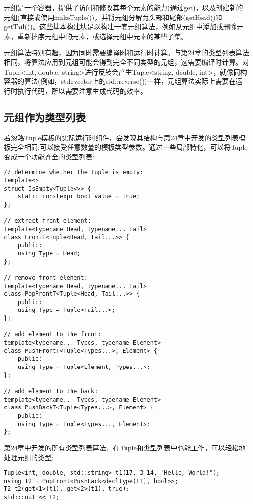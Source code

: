 
元组是一个容器，提供了访问和修改其每个元素的能力(通过get)，以及创建新的元组(直接或使用makeTuple())，并将元组分解为头部和尾部(getHead()和getTail())。这些基本构建块足以构建一套元组算法，例如从元组中添加或删除元素，重新排序元组中的元素，或选择元组中元素的某些子集。

元组算法特别有趣，因为同时需要编译时和运行时计算。与第24章的类型列表算法相同，将算法应用到元组可能会得到完全不同类型的元组，这需要编译时计算。对Tuple<int, double, string>进行反转会产生Tuple<string, double, int>，就像同构容器的算法(例如，std::vector上的std::reverse())一样，元组算法实际上需要在运行时执行代码，所以需要注意生成代码的效率。

\subsection{元组作为类型列表}

若忽略Tuple模板的实际运行时组件，会发现其结构与第24章中开发的类型列表模板完全相同:可以接受任意数量的模板类型参数。通过一些局部特化，可以将Tuple变成一个功能齐全的类型列表:

\begin{lstlisting}[style=styleCXX]
// determine whether the tuple is empty:
template<>
struct IsEmpty<Tuple<>> {
	static constexpr bool value = true;
};

// extract front element:
template<typename Head, typename... Tail>
class FrontT<Tuple<Head, Tail...>> {
	public:
	using Type = Head;
};

// remove front element:
template<typename Head, typename... Tail>
class PopFrontT<Tuple<Head, Tail...>> {
	public:
	using Type = Tuple<Tail...>;
};

// add element to the front:
template<typename... Types, typename Element>
class PushFrontT<Tuple<Types...>, Element> {
	public:
	using Type = Tuple<Element, Types...>;
};

// add element to the back:
template<typename... Types, typename Element>
class PushBackT<Tuple<Types...>, Element> {
	public:
	using Type = Tuple<Types..., Element>;
};
\end{lstlisting}

第24章中开发的所有类型列表算法，在Tuple和类型列表中也能工作，可以轻松地处理元组的类型:

\begin{lstlisting}[style=styleCXX]
Tuple<int, double, std::string> t1(17, 3.14, "Hello, World!");
using T2 = PopFront<PushBack<decltype(t1), bool>>;
T2 t2(get<1>(t1), get<2>(t1), true);
std::cout << t2;
\end{lstlisting}

